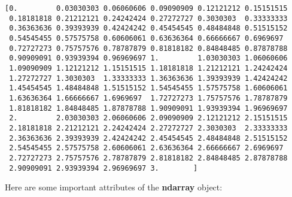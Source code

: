 \documentclass[11pt]{article}
\begin{document}
    \begin{Verbatim}[commandchars=\\\{\}]
[0.         0.03030303 0.06060606 0.09090909 0.12121212 0.15151515
 0.18181818 0.21212121 0.24242424 0.27272727 0.3030303  0.33333333
 0.36363636 0.39393939 0.42424242 0.45454545 0.48484848 0.51515152
 0.54545455 0.57575758 0.60606061 0.63636364 0.66666667 0.6969697
 0.72727273 0.75757576 0.78787879 0.81818182 0.84848485 0.87878788
 0.90909091 0.93939394 0.96969697 1.         1.03030303 1.06060606
 1.09090909 1.12121212 1.15151515 1.18181818 1.21212121 1.24242424
 1.27272727 1.3030303  1.33333333 1.36363636 1.39393939 1.42424242
 1.45454545 1.48484848 1.51515152 1.54545455 1.57575758 1.60606061
 1.63636364 1.66666667 1.6969697  1.72727273 1.75757576 1.78787879
 1.81818182 1.84848485 1.87878788 1.90909091 1.93939394 1.96969697
 2.         2.03030303 2.06060606 2.09090909 2.12121212 2.15151515
 2.18181818 2.21212121 2.24242424 2.27272727 2.3030303  2.33333333
 2.36363636 2.39393939 2.42424242 2.45454545 2.48484848 2.51515152
 2.54545455 2.57575758 2.60606061 2.63636364 2.66666667 2.6969697
 2.72727273 2.75757576 2.78787879 2.81818182 2.84848485 2.87878788
 2.90909091 2.93939394 2.96969697 3.        ]

    \end{Verbatim}

    Here are some important attributes of the \textbf{ndarray} object:
\end{document}
